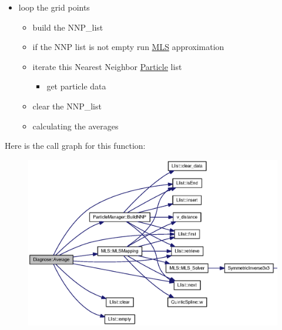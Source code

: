 \begin{itemize}
\item loop the grid points

\begin{itemize}
\item build the NNP\_\-list

\item if the NNP list is not empty run \hyperlink{classMLS}{MLS} approximation

\item iterate this Nearest Neighbor \hyperlink{classParticle}{Particle} list

\begin{itemize}
\item get particle data \end{itemize}


\item clear the NNP\_\-list

\item calculating the averages \end{itemize}
\end{itemize}


Here is the call graph for this function:\nopagebreak
\begin{figure}[H]
\begin{center}
\leavevmode
\includegraphics[width=331pt]{classDiagnose_8c14b3fa58083f64be2018bd0462604d_cgraph}
\end{center}
\end{figure}


